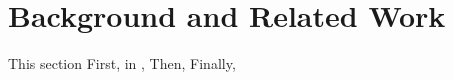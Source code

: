 \section{Background and Related Work}\label{sec:network:background}
This section
First, in ,
Then,
Finally, 
